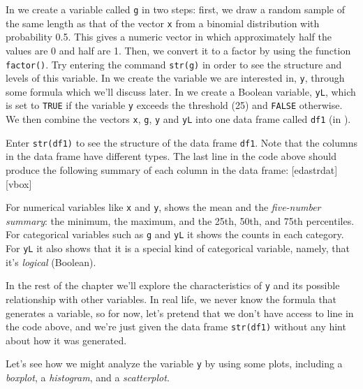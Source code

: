 In  we create a variable called \lstinline{g} in two steps:
first, we draw a random sample of the same length as that of the vector \lstinline{x}
from a binomial distribution with probability 0.5. This gives a numeric vector
in which approximately half the values are 0 and half are 1. Then, we convert it
to a factor by using the function \lstinline{factor()}. Try entering the
command \lstinline{str(g)} in order to see the structure and levels of this
variable. In   we create the
variable we are interested in, \lstinline{y}, through some formula which we'll
discuss later. In   we create a Boolean variable, \lstinline{yL},
which is set to \lstinline{TRUE} if the variable \lstinline{y} exceeds the
threshold (25) and \lstinline{FALSE}
otherwise. We then combine the vectors \lstinline{x}, \lstinline{g},
\lstinline{y} and \lstinline{yL} into one data frame called \lstinline{df1} (in
).

Enter \lstinline{str(df1)} to see the structure of the data frame
\lstinline{df1}. Note that the columns in the data frame have different types.
The last line in the code above should produce the following summary of each
column in the data frame:
[edastrdat][vbox]

For numerical variables like \lstinline{x} and \lstinline{y}, \R shows the mean
and the \emph{five-number summary}: the minimum, the maximum, and the 25th,
50th, and 75th
percentiles. For categorical variables such as \lstinline{g} and \lstinline{yL}
it shows the counts in each category. For \lstinline{yL} it also shows that it
is a special
kind of categorical variable, namely, that it's \emph{logical} (Boolean).

In the rest of the chapter we'll  explore the characteristics of
\lstinline{y} and its possible relationship with other variables. In real life, we
never know the formula that generates a variable, so for now, let's pretend that we
don't have access to line  in the code above, and we're just given
the data frame \lstinline{str(df1)} without any hint about how it was
generated.

Let's see how we might analyze the variable \lstinline{y} by using some plots,
including a \emph{boxplot}, a \emph{histogram}, and a \emph{scatterplot}.



